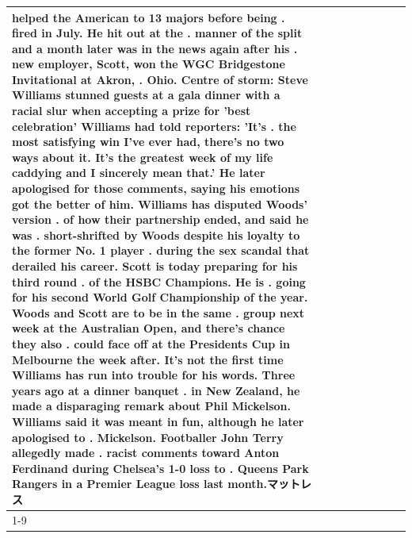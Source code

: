 \begin{table}[H]
\begin{tabular}{lllrlllll}
helped the American to 13 majors before being . fired in July. He hit out at the . manner of the split and a month later was in the news again after his . new employer, Scott, won the WGC Bridgestone Invitational at Akron, . Ohio. Centre of storm: Steve Williams stunned guests at a gala dinner with a racial slur when accepting a prize for 'best celebration' Williams had told reporters: 'It's . the most satisfying win I've ever had, there's no two ways about it. It's the greatest week of my life caddying and I sincerely mean that.' He later apologised for those comments, saying his emotions got the better of him. Williams has disputed Woods' version . of how their partnership ended, and said he was . short-shrifted by Woods despite his loyalty to the former No. 1 player . during the sex scandal that derailed his career. Scott is today preparing for his third round . of the HSBC Champions. He is . going for his second World Golf Championship of the year. Woods and Scott are to be in the same . group next week at the Australian Open, and there's chance they also . could face off at the Presidents Cup in Melbourne the week after. It's not the first time Williams has run into trouble for his words. Three years ago at a dinner banquet . in New Zealand, he made a disparaging remark about Phil Mickelson. Williams said it was meant in fun, although he later apologised to . Mickelson. Footballer John Terry allegedly made . racist comments toward Anton Ferdinand during Chelsea's 1-0 loss to . Queens Park Rangers in a Premier League loss last month.マットレス \\
\cline{1-9}

\end{tabular}
\end{table}
